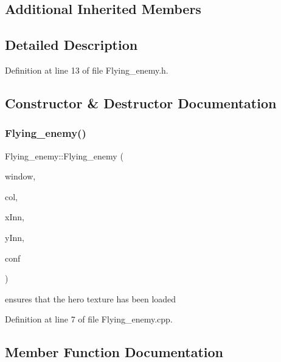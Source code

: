 \subsection*{Additional Inherited Members}


\subsection{Detailed Description}


Definition at line 13 of file Flying\+\_\+enemy.\+h.



\subsection{Constructor \& Destructor Documentation}
\hypertarget{class_flying__enemy_a2421fcde96321136c07dff8ad05f459b}{}\label{class_flying__enemy_a2421fcde96321136c07dff8ad05f459b} 
\subsubsection{\texorpdfstring{Flying\+\_\+enemy()}{Flying\_enemy()}}
{\footnotesize\ttfamily Flying\+\_\+enemy\+::\+Flying\+\_\+enemy (\begin{DoxyParamCaption}\item[{sf\+::\+Render\+Window \&}]{window,  }\item[{\hyperlink{class_collision}{Collision}}]{col,  }\item[{int}]{x\+Inn,  }\item[{int}]{y\+Inn,  }\item[{\hyperlink{class_config}{Config} \&}]{conf }\end{DoxyParamCaption})}

ensures that the hero texture has been loaded 

Definition at line 7 of file Flying\+\_\+enemy.\+cpp.



\subsection{Member Function Documentation}
\hypertarget{class_flying__enemy_a79631d3c3cf673c0651be53eac8ac330}{}\label{class_flying__enemy_a79631d3c3cf673c0651be53eac8ac330} 
